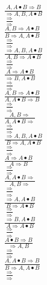 \documentclass[11pt]{article}
\begin{document}
\begin{center}

$\frac{A, A\bullet B\Rightarrow B}{\Rightarrow A, B, A\bullet B}$
\bigskip
\\$\frac{\Rightarrow }{\Rightarrow }$
\bigskip
\\$\frac{A, B\Rightarrow A\bullet B}{B\Rightarrow A, A\bullet B}$
\bigskip
\\$\frac{\Rightarrow }{\Rightarrow }$
\bigskip
\\$\frac{\Rightarrow A, B, A\bullet B}{A, B\Rightarrow A\bullet B}$
\bigskip
\\$\frac{\Rightarrow }{\Rightarrow }$
\bigskip
\\$\frac{A\Rightarrow A\bullet B}{\Rightarrow B, A\bullet B}$
\bigskip
\\$\frac{\Rightarrow }{\Rightarrow }$
\bigskip
\\$\frac{A, B\Rightarrow A\bullet B}{A, A\bullet B\Rightarrow B}$
\bigskip
\\$\frac{\Rightarrow }{\Rightarrow }$
\bigskip
\\$\frac{A, B\Rightarrow }{A, A\bullet B\Rightarrow }$
\bigskip
\\$\frac{\Rightarrow }{\Rightarrow }$
\bigskip
\\$\frac{\Rightarrow A, B, A\bullet B}{B\Rightarrow A, A\bullet B}$
\bigskip
\\$\frac{\Rightarrow }{\Rightarrow }$
\bigskip
\\$\frac{A\Rightarrow A\bullet B}{A\Rightarrow B}$
\bigskip
\\$\frac{\Rightarrow }{\Rightarrow }$
\bigskip
\\$\frac{A, A\bullet B\Rightarrow }{A, B\Rightarrow }$
\bigskip
\\$\frac{\Rightarrow }{\Rightarrow }$
\bigskip
\\$\frac{\Rightarrow A, A\bullet B}{B\Rightarrow A\bullet B}$
\bigskip
\\$\frac{\Rightarrow }{\Rightarrow }$
\bigskip
\\$\frac{\Rightarrow B, A\bullet B}{A\Rightarrow A\bullet B}$
\bigskip
\\$\frac{\Rightarrow }{\Rightarrow }$
\bigskip
\\$\frac{A\bullet B\Rightarrow B}{\Rightarrow A, B}$
\bigskip
\\$\frac{\Rightarrow }{\Rightarrow }$
\bigskip
\\$\frac{A, A\bullet B\Rightarrow B}{B\Rightarrow A, A\bullet B}$
\bigskip
\\$\frac{\Rightarrow }{\Rightarrow }$

\end{center}
\end{document}
